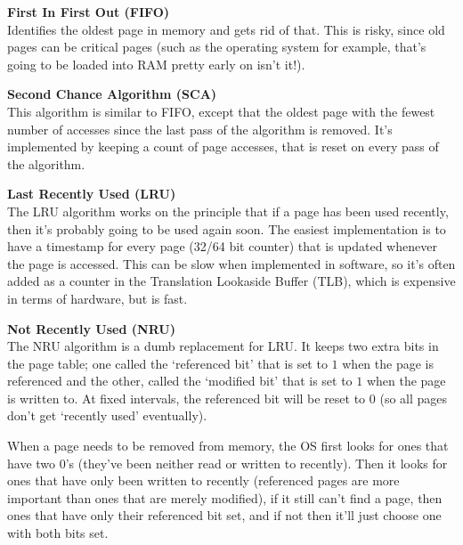 \begin{description}
  \item \textbf{First In First Out (FIFO)}\\
    Identifies the oldest page in memory and gets rid of that. This is risky,
    since old pages can be critical pages (such as the operating system for
    example, that's going to be loaded into RAM pretty early on isn't it!).

  \item \textbf{Second Chance Algorithm (SCA)}\\
    This algorithm is similar to FIFO, except that the oldest page with the
    fewest number of accesses since the last pass of the algorithm is removed.
    It's implemented by keeping a count of page accesses, that is reset on every
    pass of the algorithm.

  \item \textbf{Last Recently Used (LRU)}\\
    The LRU algorithm works on the principle that if a page has been used
    recently, then it's probably going to be used again soon. The easiest
    implementation is to have a timestamp for every page (32/64 bit counter)
    that is updated whenever the page is accessed. This can be slow when
    implemented in software, so it's often added as a counter in the Translation
    Lookaside Buffer (TLB), which is
    expensive in terms of hardware, but is fast.

  \item \textbf{Not Recently Used (NRU)}\\
    The NRU algorithm is a dumb replacement for LRU. It keeps two extra bits in
    the page table; one called the `referenced bit' that is set to $1$ when the
    page is referenced and the other, called the `modified bit' that is set to
    $1$ when the page is written to. At fixed intervals, the referenced bit will
    be reset to $0$ (so all pages don't get `recently used' eventually).


    When a page needs to be removed from memory, the OS first looks for ones
    that have two $0$'s (they've been neither read or written to recently). Then
    it looks for ones that have only been written to recently (referenced pages
    are more important than ones that are merely modified), if it still can't
    find a page, then ones that have only their referenced bit set, and if not
    then it'll just choose one with both bits set.
\end{description}

